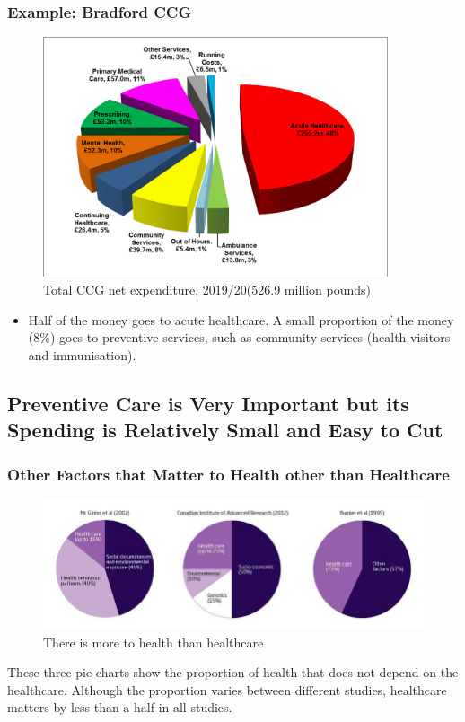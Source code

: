         \subsubsection{Example: Bradford CCG}         
            \begin{figure}[H]
                \centering
                \includegraphics[width=4in]{images/ch3/12.png}
                \caption{Total CCG net expenditure, 2019/20(526.9 million pounds)}
            \end{figure} 
           \begin{itemize}           
                \item Half of the money goes to acute healthcare. A small proportion of the money (8\%) goes to preventive services, such as community services (health visitors and immunisation).
            \end{itemize}
        
        \subsection{Preventive Care is Very Important but its Spending is Relatively Small and Easy to Cut}
        
             \subsubsection{Other Factors that Matter to Health other than Healthcare} 
                \begin{figure}[H]
                    \centering
                    \includegraphics[width=5in]{images/ch3/14.png}
                    \caption{There is more to health than healthcare}
                \end{figure} 
                These three pie charts show the proportion of health that does not depend on the healthcare. Although the proportion varies between different studies, healthcare matters by less than a half in all studies.
    
